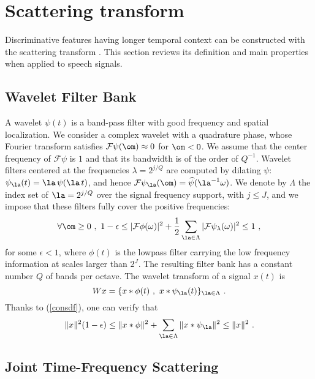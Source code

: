 \section{Scattering transform}
\label{scattsec}

Discriminative features having longer temporal context can be constructed with the 
scattering transform \cite{deepscatt,pami}. 
This section reviews its definition and main properties when applied to speech signals.

\subsection{Wavelet Filter Bank}

A wavelet $\psi (t)$ is a band-pass filter with good frequency and spatial localization.
 We consider a complex wavelet with a quadrature phase, 
whose Fourier transform satisfies
$\mathcal{F} \psi(\om) \approx 0$ for $\om < 0$.
We assume that the center frequency of $\mathcal{F} \psi$ is $1$ and 
that its bandwidth is of the order of $Q^{-1}$. 
Wavelet filters centered
at the frequencies $\lambda = 2^{j/Q}$ are computed by dilating $\psi$:
$\psi_\la (t) = \la\, \psi(\la\, t)$, and hence $\mathcal{F} \psi_\la (\om) = \widehat \psi(\la^{-1} \omega)$.
We denote by $\Lambda$ the index set of $\la = 2^{j/Q}$ over
the signal frequency support, with $j \leq J$, 
and we impose that these filters fully cover the positive frequencies:
\begin{equation}
\label{consdf}
\forall \om \geq 0~,~ 1- \epsilon 
\leq |\mathcal{F}{\phi}(\omega)|^2 + \frac 1 2 \sum_{\la \in \Lambda} |\mathcal{F}{\psi}_{\lambda}(\omega)|^2 \leq 1~,
\end{equation}
for some $\epsilon <1$, where $\phi(t)$ is the lowpass filter carrying the 
low frequency information at scales larger than $2^J$.
The resulting filter bank has a constant number $Q$ of bands per 
octave. The wavelet transform of a signal $x(t)$ is
\[
W x = \{x \ast \phi(t)~,~x \ast \psi_\la(t)  \}_{\la \in \Lambda}~.
\]
Thanks to (\ref{consdf}), one can verify that 
\begin{equation}
\label{lp_basic}
\| x \|^2 (1- \epsilon) \leq \| x \ast \phi \|^2 + \sum_{\la \in \Lambda} \| x \ast \psi_\la \|^2  \leq \| x \|^2~.
\end{equation}

\subsection{Joint Time-Frequency Scattering}

